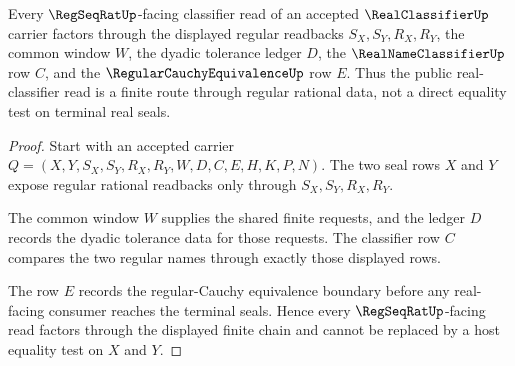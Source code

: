 \begin{theorem}
\label{thm:real-classifier-regseqrat-handoff}
Every $\RegSeqRatUp$-facing classifier read of an accepted $\RealClassifierUp$ carrier factors through the displayed regular readbacks $S_X,S_Y,R_X,R_Y$, the common window $W$, the dyadic tolerance ledger $D$, the $\RealNameClassifierUp$ row $C$, and the $\RegularCauchyEquivalenceUp$ row $E$. Thus the public real-classifier read is a finite route through regular rational data, not a direct equality test on terminal real seals.
\end{theorem}
\begin{proof}
Start with an accepted carrier $Q=(X,Y,S_X,S_Y,R_X,R_Y,W,D,C,E,H,K,P,N)$. The two seal rows $X$ and $Y$ expose regular rational readbacks only through $S_X,S_Y,R_X,R_Y$.

The common window $W$ supplies the shared finite requests, and the ledger $D$ records the dyadic tolerance data for those requests. The classifier row $C$ compares the two regular names through exactly those displayed rows.

The row $E$ records the regular-Cauchy equivalence boundary before any real-facing consumer reaches the terminal seals. Hence every $\RegSeqRatUp$-facing read factors through the displayed finite chain and cannot be replaced by a host equality test on $X$ and $Y$.
\end{proof}

